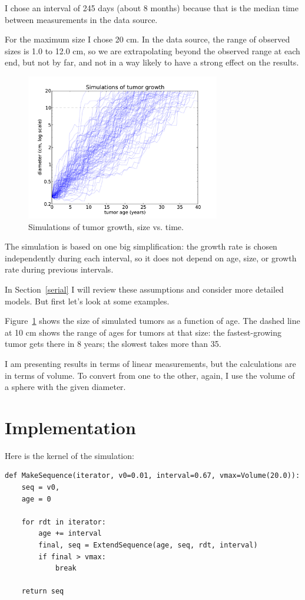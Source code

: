 \documentclass[12pt]{book}
\begin{document}
I chose an interval of 245 days (about 8 months) because that is the
median time between measurements in the data source.

For the maximum size I chose 20 cm.  In the data source, the range of
observed sizes is 1.0 to 12.0 cm, so we are extrapolating beyond
the observed range at each end, but not by far, and not in a way
likely to have a strong effect on the results.

\begin{figure}
\centerline{\includegraphics[height=2.5in]{figs/kidney4.pdf}}
\caption{Simulations of tumor growth, size vs. time.}
\label{fig.kidney4}
\end{figure}

The simulation is based on one big simplification:
the growth rate is chosen independently during each interval,
so it does not depend on age, size, or growth rate during
previous intervals.

In Section~\ref{serial} I will review these assumptions and
consider more detailed models.  But first let's look at some
examples.

Figure~\ref{fig.kidney4} shows 
the size of simulated tumors as a function of
age.  The dashed line at 10 cm shows the range of ages for tumors at
that size: the fastest-growing tumor gets there in 8 years; the
slowest takes more than 35.

I am presenting results in terms of linear measurements, but the
calculations are in terms of volume.  To convert from one to the
other, again, I use the volume of a sphere with the given
diameter.


\section{Implementation}

Here is the kernel of the simulation:

\begin{verbatim}
def MakeSequence(iterator, v0=0.01, interval=0.67, vmax=Volume(20.0)):
    seq = v0,
    age = 0

    for rdt in iterator:
        age += interval
        final, seq = ExtendSequence(age, seq, rdt, interval)
        if final > vmax:
            break

    return seq
\end{verbatim}
\end{document}
